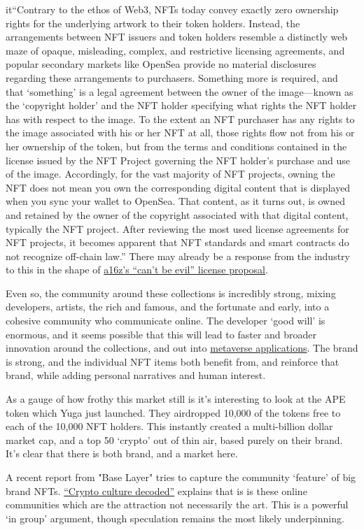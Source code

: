 it{``Contrary to the ethos of Web3, NFTs today convey exactly zero ownership rights for the underlying artwork to their token holders. Instead, the arrangements between NFT issuers and token holders resemble a distinctly web maze of opaque, misleading, complex, and restrictive licensing agreements, and popular secondary markets like OpenSea provide no material disclosures regarding these arrangements to purchasers. Something more is required, and that `something' is a legal agreement between the owner of the image—known as the `copyright holder' and the NFT holder specifying what rights the NFT holder has with respect to the image. To the extent an NFT purchaser has any rights to the image associated with his or her NFT at all, those rights flow not from his or her ownership of the token, but from the terms and conditions contained in the license issued by the NFT Project governing the NFT holder’s purchase and use of the image. Accordingly, for the vast majority of NFT projects, owning the NFT does not mean you own the corresponding digital content that is displayed when you sync your wallet to OpenSea. That content, as it turns out, is owned and retained by the owner of the copyright associated with that digital content, typically the NFT project.
After reviewing the most used license agreements for NFT projects, it becomes apparent that NFT standards and smart contracts do not recognize off-chain law.''} There may already be a response from the industry to this in the shape of \href{https://a16zcrypto.com/introducing-nft-licenses/}{a16z's ``can't be evil'' license proposal}.\par
Even so, the community around these collections is incredibly strong, mixing developers, artists, the rich and famous, and the fortunate and early, into a cohesive community who communicate online. The developer `good will' is enormous, and it seems possible that this will lead to faster and broader innovation around the collections, and out into \href{https://twitter.com/yugalabs/status/1505014986556551172?}{metaverse applications}. The brand is strong, and the individual NFT items both benefit from, and reinforce that brand, while adding personal narratives and human interest.\par 
As a gauge of how frothy this market still is it's interesting to look at the APE token which Yuga just launched. They airdropped 10,000 of the tokens free to each of the 10,000 NFT holders. This instantly created a multi-billion dollar market cap, and a top 50 `crypto' out of thin air, based purely on their brand. It's clear that there is both brand, and a market here.\par
A recent report from "Base Layer" tries to capture the community `feature' of big brand NFTs. \href{https://baselayer.so/crypto-culture-decoded}{``Crypto culture decoded''} explains that is is these online communities which are the attraction not necessarily the art. This is a powerful `in group' argument, though speculation remains the most likely underpinning.\par

